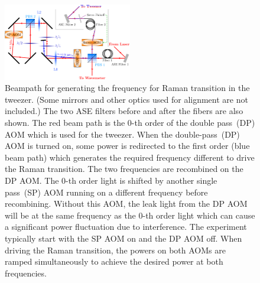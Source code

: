 \documentclass[aps,prl,twocolumn,10pt,superscriptaddress]{revtex4-1}
\begin{document}
\begin{figure}
  \includegraphics[width=0.5\textwidth]{imgs/raman_spectroscopy_raman_beampath.pdf}
  \caption{
    Beampath for generating the frequency for Raman transition in the tweezer.
    (Some mirrors and other optics used for alignment are not included.)
    The two ASE filters before and after the fibers are also shown.
    The red beam path is the $0$-th order of the double pass~(DP) AOM
    which is used for the tweezer.
    When the double-pass~(DP) AOM is turned on, some power is redirected to the first order
    (blue beam path) which generates the required frequency different to drive
    the Raman transition. The two frequencies are recombined on the DP AOM.
    The $0$-th order light is shifted by another single pass~(SP) AOM
    running on a different frequency before recombining.
    Without this AOM, the leak light from the DP AOM will be at the same frequency
    as the $0$-th order light which can cause a significant power fluctuation
    due to interference.
    The experiment typically start with the SP AOM on and the DP AOM off.
    When driving the Raman transition, the powers on both AOMs are ramped simultaneously
    to achieve the desired power at both frequencies.
    \label{f-beampath}
  }
\end{figure}
\end{document}
